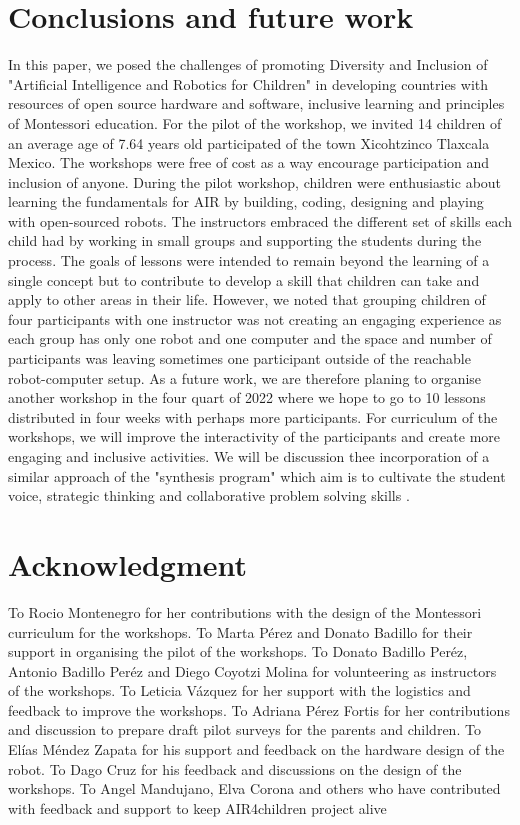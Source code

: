 \documentclass[conference]{IEEEtran}
\begin{document}
\section{Conclusions and future work}
In this paper, we posed the challenges of promoting Diversity and Inclusion of "Artificial Intelligence and Robotics for Children" in developing countries with resources of open source hardware and software, inclusive learning and principles of Montessori education. 
For the pilot of the workshop, we invited 14 children of an average age of 7.64 years old participated of the town Xicohtzinco Tlaxcala Mexico.
The workshops were free of cost as a way encourage participation and inclusion of anyone. 
During the pilot workshop, children were enthusiastic about learning the fundamentals for AIR by building, coding, designing and playing with open-sourced robots. 
The instructors embraced the different set of skills each child had by working in small groups and supporting the students during the process. 
The goals of lessons were intended to remain beyond the learning of a single concept but to contribute to develop a skill that children can take and apply to other areas in their life.
However, we noted that grouping children of four participants with one instructor was not creating an engaging experience as each group has only one robot and one computer and the space and number of participants was leaving sometimes one participant outside of the reachable robot-computer setup.
As a future work, we are therefore planing to organise another workshop in the four quart of 2022 where we hope to go to 10 lessons distributed in four weeks with perhaps more participants.
For curriculum of the workshops, we will improve the interactivity of the participants and create more engaging and inclusive activities. 
We will be discussion thee incorporation of a similar approach of the "synthesis program" which aim is to cultivate the student voice, strategic thinking and collaborative problem solving skills \cite{synthesis2022}.


\section*{Acknowledgment}
To Rocio Montenegro for her contributions with the design of the Montessori curriculum for the workshops.
To Marta P\'erez and Donato Badillo for their support in organising the pilot of the workshops.
To Donato Badillo Per\'ez, Antonio Badillo Per\'ez and Diego Coyotzi Molina for volunteering as instructors of the workshops.
To Leticia V\'azquez for her support with the logistics and feedback to improve the workshops.
To Adriana P\'erez Fortis for her contributions and discussion to prepare draft pilot surveys for the parents and children. 
To El\'ias M\'endez Zapata for his support and feedback on the hardware design of the robot.
To Dago Cruz for his feedback and discussions on the design of the workshops.
To Angel Mandujano, Elva Corona and others who have contributed with feedback and support to keep AIR4children project alive
\end{document}
